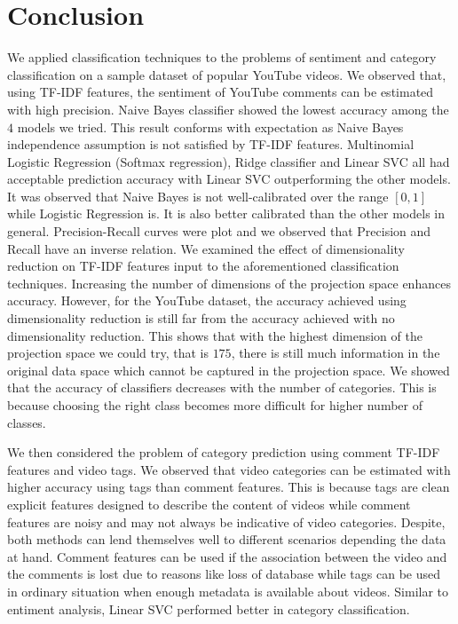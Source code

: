 \section{Conclusion}
\label{sec:conclusion}
We applied classification techniques to the problems of sentiment and category classification on a sample dataset of popular YouTube videos.
We observed that, using TF-IDF features, the sentiment of YouTube comments can be estimated with high precision. Naive Bayes classifier showed the lowest accuracy among the $4$ models we tried. This result conforms with expectation as Naive Bayes independence assumption is not satisfied by TF-IDF features. Multinomial Logistic Regression (Softmax regression), Ridge classifier and Linear SVC all had acceptable prediction accuracy with Linear SVC outperforming the other models. It was observed that Naive Bayes is not well-calibrated over the range $[0,1]$ while Logistic Regression is. It is also better calibrated than the other models in general. Precision-Recall curves were plot and we observed that Precision and Recall have an inverse relation. We examined the effect of dimensionality reduction on TF-IDF features input to the aforementioned classification techniques. Increasing the number of dimensions of the projection space enhances accuracy. However, for the YouTube dataset, the accuracy achieved using dimensionality reduction is still far from the accuracy achieved with no dimensionality reduction. This shows that with the highest dimension of the projection space we could try, that is $175$, there is still much information in the original data space which cannot be captured in the projection space. We showed that the accuracy of classifiers decreases with the number of categories. This is because choosing the right class becomes more difficult for higher number of classes.

We then considered the problem of category prediction using comment TF-IDF features and video tags. We observed that video categories can be estimated with higher accuracy using tags than comment features. This is because tags are clean explicit features designed to describe the content of videos while comment features are noisy and may not always be indicative of video categories. Despite, both methods can lend themselves well to different scenarios depending the data at hand. Comment features can be used if the association between the video and the comments is lost due to reasons like loss of database while tags can be used in ordinary situation when enough metadata is available about videos. Similar to entiment analysis, Linear SVC performed better in category classification.

 